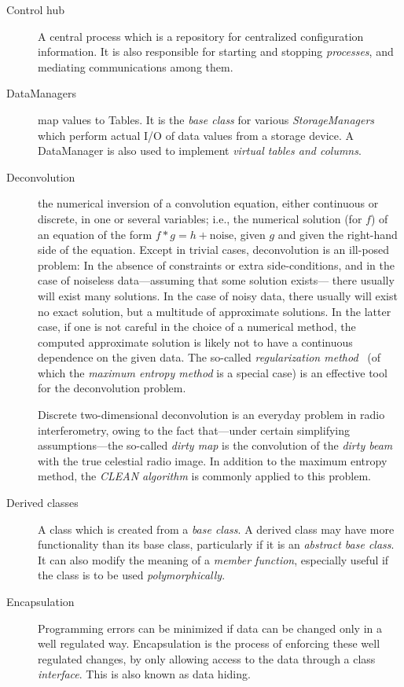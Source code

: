\begin{description}
\item[Control hub] A central process which is a repository for
centralized configuration information. It is also responsible for
starting and stopping {\em processes}, and mediating communications
among them.

\item[DataManagers]
map values to Tables. It is the {\em base class} for various {\em
StorageManagers} which perform actual I/O of data values from a storage
device. A DataManager is also used to implement {\em virtual tables
and columns}.


\item[Deconvolution]
the numerical inversion of a convolution equation, either continuous
or discrete, in one or several variables;
i.e., the numerical solution (for $f$) of an equation of the form
$f\ast g=h+\text{noise}$, given $g$ and given the right-hand side
of the equation.
Except in trivial cases, deconvolution is an ill-posed problem:
In the absence of constraints or extra side-conditions,
and in the case of noiseless data---assuming that some solution exists---%
there usually will exist many solutions.
In the case of noisy data, there usually will exist no exact solution,
but a multitude of approximate solutions.
In the latter case, if one is not careful in the choice of a numerical method,
the computed approximate solution is likely not to have
a continuous dependence on the given data.
The so-called {\it regularization method} \qv\ (of which the {\it maximum
entropy method} is a special case) is an effective tool for the
deconvolution problem.
\par
Discrete two-dimensional deconvolution is an everyday problem in
radio interferometry, owing to the fact that---under certain simplifying
assumptions---the so-called {\it dirty map} is the convolution of
the {\it dirty beam} with the true celestial radio image.
In addition to the maximum entropy method,
the {\it CLEAN algorithm} is commonly applied to this problem.


\item[Derived classes]
A class which is created from a {\em base class}. A derived class may
have more functionality than its base class, particularly if it is an
{\em abstract base class}. It can also modify the meaning of a {\em
member function}, especially useful if the class is to be used {\em
polymorphically}. 


\item[Encapsulation] Programming errors can be minimized if data can
be changed only in a well regulated way. Encapsulation is the process
of enforcing these well regulated changes, by only allowing access to
the data through a class {\em interface}. This is also known as data
hiding.



\end{description}
